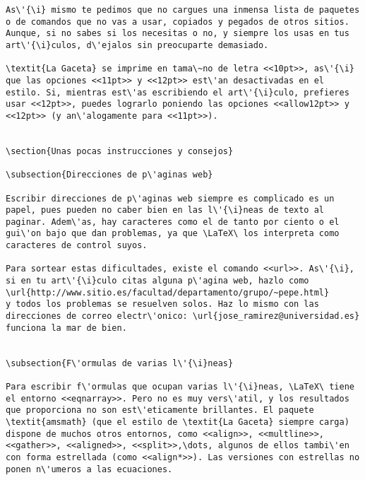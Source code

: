 \documentclass[11pt, a4paper]{article}
\begin{document}
\begin{lstlisting}
As\'{\i} mismo te pedimos que no cargues una inmensa lista de paquetes o de comandos que no vas a usar, copiados y pegados de otros sitios. Aunque, si no sabes si los necesitas o no, y siempre los usas en tus art\'{\i}culos, d\'ejalos sin preocuparte demasiado.

\textit{La Gaceta} se imprime en tama\~no de letra <<10pt>>, as\'{\i} que las opciones <<11pt>> y <<12pt>> est\'an desactivadas en el estilo. Si, mientras est\'as escribiendo el art\'{\i}culo, prefieres usar <<12pt>>, puedes lograrlo poniendo las opciones <<allow12pt>> y <<12pt>> (y an\'alogamente para <<11pt>>).


\section{Unas pocas instrucciones y consejos}

\subsection{Direcciones de p\'aginas web}

Escribir direcciones de p\'aginas web siempre es complicado es un papel, pues pueden no caber bien en las l\'{\i}neas de texto al paginar. Adem\'as, hay caracteres como el de tanto por ciento o el gui\'on bajo que dan problemas, ya que \LaTeX\ los interpreta como caracteres de control suyos.

Para sortear estas dificultades, existe el comando <<url>>. As\'{\i}, si en tu art\'{\i}culo citas alguna p\'agina web, hazlo como
\url{http://www.sitio.es/facultad/departamento/grupo/~pepe.html}
y todos los problemas se resuelven solos. Haz lo mismo con las direcciones de correo electr\'onico: \url{jose_ramirez@universidad.es} funciona la mar de bien.


\subsection{F\'ormulas de varias l\'{\i}neas}

Para escribir f\'ormulas que ocupan varias l\'{\i}neas, \LaTeX\ tiene el entorno <<eqnarray>>. Pero no es muy vers\'atil, y los resultados que proporciona no son est\'eticamente brillantes. El paquete \textit{amsmath} (que el estilo de \textit{La Gaceta} siempre carga) dispone de muchos otros entornos, como <<align>>, <<multline>>, <<gather>>, <<aligned>>, <<split>>,\dots, algunos de ellos tambi\'en con forma estrellada (como <<align*>>). Las versiones con estrellas no ponen n\'umeros a las ecuaciones.


\end{lstlisting}
\end{document}
